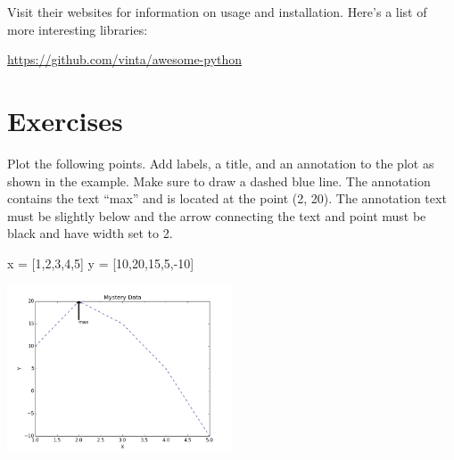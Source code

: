 \documentclass[11pt]{cselabheader}
\begin{document}
Visit their websites for information on usage and installation.
Here's a list of more interesting libraries:
\begin{center}
\url{https://github.com/vinta/awesome-python}
\end{center}

\newpage
\section{Exercises}
\begin{ex}[plotpoints.py]
Plot the following points. Add labels, a title, and an annotation to the plot
as shown in the example. Make sure to draw a dashed blue line.
The annotation contains the text ``max'' and is located at the point (2, 20).
The annotation text must be slightly below and the arrow connecting the text
and point must be black and have width set to 2.

\begin{python3code}
x = [1,2,3,4,5]
y = [10,20,15,5,-10]
\end{python3code}

\begin{center}
\includegraphics[width=0.5\textwidth]{img/basic.png}
\end{center}
\end{ex}
\end{document}
